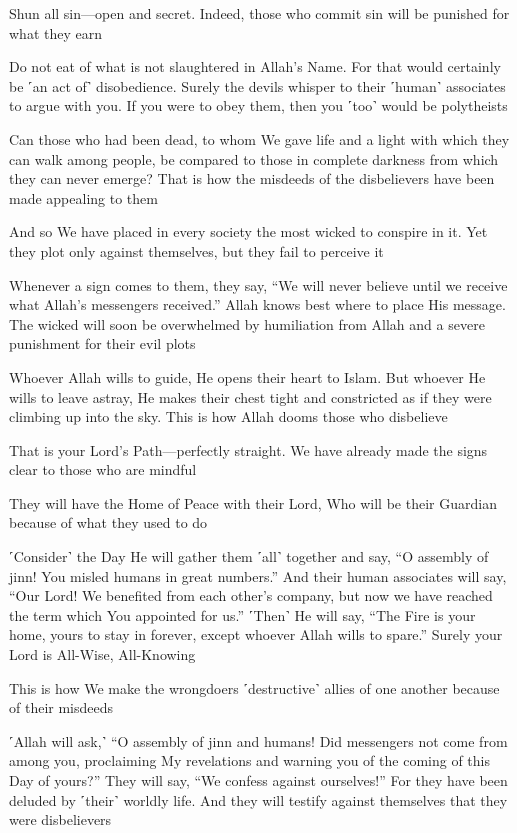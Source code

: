 Shun all sin—open and secret. Indeed, those who commit sin will be punished for what they earn

Do not eat of what is not slaughtered in Allah’s Name. For that would certainly be ˹an act of˺ disobedience. Surely the devils whisper to their ˹human˺ associates to argue with you. If you were to obey them, then you ˹too˺ would be polytheists

Can those who had been dead, to whom We gave life and a light with which they can walk among people, be compared to those in complete darkness from which they can never emerge? That is how the misdeeds of the disbelievers have been made appealing to them

And so We have placed in every society the most wicked to conspire in it. Yet they plot only against themselves, but they fail to perceive it

Whenever a sign comes to them, they say, “We will never believe until we receive what Allah’s messengers received.” Allah knows best where to place His message. The wicked will soon be overwhelmed by humiliation from Allah and a severe punishment for their evil plots

Whoever Allah wills to guide, He opens their heart to Islam. But whoever He wills to leave astray, He makes their chest tight and constricted as if they were climbing up into the sky. This is how Allah dooms those who disbelieve

That is your Lord’s Path—perfectly straight. We have already made the signs clear to those who are mindful

They will have the Home of Peace with their Lord, Who will be their Guardian because of what they used to do

˹Consider˺ the Day He will gather them ˹all˺ together and say, “O assembly of jinn! You misled humans in great numbers.” And their human associates will say, “Our Lord! We benefited from each other’s company, but now we have reached the term which You appointed for us.” ˹Then˺ He will say, “The Fire is your home, yours to stay in forever, except whoever Allah wills to spare.” Surely your Lord is All-Wise, All-Knowing

This is how We make the wrongdoers ˹destructive˺ allies of one another because of their misdeeds

˹Allah will ask,˺ “O assembly of jinn and humans! Did messengers not come from among you, proclaiming My revelations and warning you of the coming of this Day of yours?” They will say, “We confess against ourselves!” For they have been deluded by ˹their˺ worldly life. And they will testify against themselves that they were disbelievers

